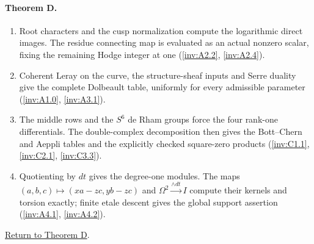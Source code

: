 \paragraph{Theorem D.}
\begin{enumerate}[label=\arabic*.]
\item\hypertarget{step-I-D-1}{} Root characters and the cusp
normalization compute the logarithmic direct images.  The residue
connecting map is evaluated as an actual nonzero scalar, fixing
the remaining Hodge integer at one
(\hyperref[inv:A2.2]{\ref*{inv:A2.2}},
\hyperref[inv:A2.4]{\ref*{inv:A2.4}}).
\item\hypertarget{step-I-D-2}{} Coherent Leray on the curve,
the structure-sheaf inputs and Serre duality give the complete
Dolbeault table, uniformly for every admissible parameter
(\hyperref[inv:A1.0]{\ref*{inv:A1.0}},
\hyperref[inv:A3.1]{\ref*{inv:A3.1}}).
\item\hypertarget{step-I-D-3}{} The middle rows and the
$S^6$ de Rham groups force the four rank-one differentials.
The double-complex decomposition then gives the Bott--Chern and
Aeppli tables and the explicitly checked square-zero products
(\hyperref[inv:C1.1]{\ref*{inv:C1.1}},
\hyperref[inv:C2.1]{\ref*{inv:C2.1}},
\hyperref[inv:C3.3]{\ref*{inv:C3.3}}).
\item\hypertarget{step-I-D-4}{} Quotienting by $dt$ gives the
degree-one modules.  The maps $(a,b,c)\mapsto(xa-zc,yb-zc)$
and $\Omega^2\xrightarrow{\wedge dt}I$ compute their kernels
and torsion exactly; finite etale descent gives the global
support assertion
(\hyperref[inv:A4.1]{\ref*{inv:A4.1}},
\hyperref[inv:A4.2]{\ref*{inv:A4.2}}).
\end{enumerate}
\hyperlink{main-I-D}{Return to Theorem D}.

\hypertarget{outline-I-E}{}
